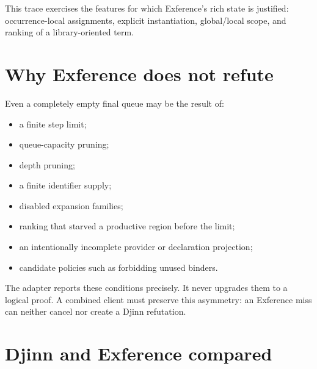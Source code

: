 \documentclass[10pt,letterpaper,oneside]{report}
\begin{document}
This trace exercises the features for which Exference's rich state is justified: occurrence-local assignments, explicit instantiation, global/local scope, and ranking of a library-oriented term.

\section{Why Exference does not refute}

Even a completely empty final queue may be the result of:

\begin{itemize}
  \item a finite step limit;
  \item queue-capacity pruning;
  \item depth pruning;
  \item a finite identifier supply;
  \item disabled expansion families;
  \item ranking that starved a productive region before the limit;
  \item an intentionally incomplete provider or declaration projection;
  \item candidate policies such as forbidding unused binders.
\end{itemize}

The adapter reports these conditions precisely. It never upgrades them to a logical proof. A combined client must preserve this asymmetry: an Exference miss can neither cancel nor create a Djinn refutation.

\section{Djinn and Exference compared}
\end{document}
